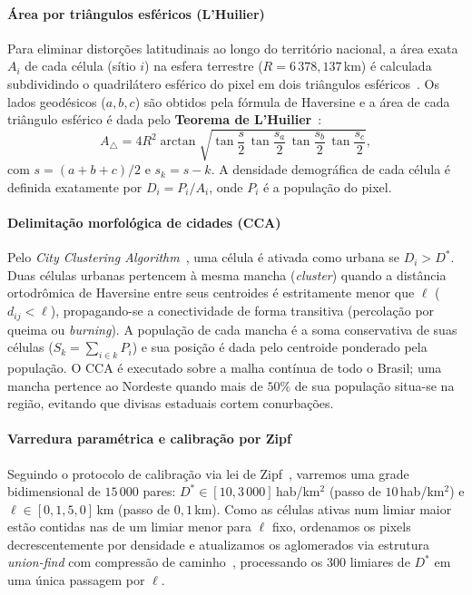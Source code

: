 \documentclass[10pt,a4paper,twocolumn]{article}
\begin{document}
\paragraph{Área por triângulos esféricos (L'Huilier)} Para eliminar distorções latitudinais ao longo do território nacional, a área exata $A_i$ de cada célula (sítio $i$) na esfera terrestre ($R = 6\,378{,}137$\,km) é calculada subdividindo o quadrilátero esférico do pixel em dois triângulos esféricos~\cite{oliveira2019}. Os lados geodésicos ($a, b, c$) são obtidos pela fórmula de Haversine e a área de cada triângulo esférico é dada pelo \textbf{Teorema de L'Huilier}~\cite{oliveira2019}:
%
\begin{equation}
A_{\triangle} = 4R^{2}\arctan\sqrt{\tan\frac{s}{2}\,\tan\frac{s_a}{2}\,\tan\frac{s_b}{2}\,\tan\frac{s_c}{2}},
\label{eq:lhuilier}
\end{equation}
%
com $s=(a+b+c)/2$ e $s_k = s - k$. A densidade demográfica de cada célula é definida exatamente por $D_i = P_i / A_i$, onde $P_i$ é a população do pixel.

\paragraph{Delimitação morfológica de cidades (CCA)} Pelo \emph{City Clustering Algorithm}~\cite{rozenfeld2008,oliveira2014,oliveira2018}, uma célula é ativada como urbana se $D_i > D^{*}$. Duas células urbanas pertencem à mesma mancha (\emph{cluster}) quando a distância ortodrômica de Haversine entre seus centroides é estritamente menor que $\ell$ ($d_{ij} < \ell$), propagando-se a conectividade de forma transitiva (percolação por queima ou \emph{burning}). A população de cada mancha é a soma conservativa de suas células ($S_k = \sum_{i\in k} P_i$) e sua posição é dada pelo centroide ponderado pela população. O CCA é executado sobre a malha contínua de todo o Brasil; uma mancha pertence ao Nordeste quando mais de $50\%$ de sua população situa-se na região, evitando que divisas estaduais cortem conurbações.

\paragraph{Varredura paramétrica e calibração por Zipf} Seguindo o protocolo de calibração via lei de Zipf~\cite{oliveira2018}, varremos uma grade bidimensional de $15\,000$ pares: $D^{*} \in [10, 3\,000]$\,hab/km$^{2}$ (passo de $10$\,hab/km$^{2}$) e $\ell \in [0{,}1, 5{,}0]$\,km (passo de $0{,}1$\,km). Como as células ativas num limiar maior estão contidas nas de um limiar menor para $\ell$ fixo, ordenamos os pixels decrescentemente por densidade e atualizamos os aglomerados via estrutura \emph{union-find} com compressão de caminho~\cite{tarjan1975}, processando os 300 limiares de $D^{*}$ em uma única passagem por $\ell$.
\end{document}

